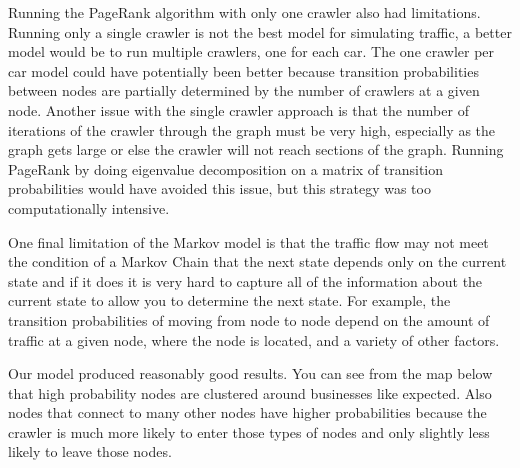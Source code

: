 \documentclass{article}
\begin{document}
Running the PageRank algorithm with only one crawler also had limitations. Running only a single crawler is not the best model for simulating traffic, a better model would be to run multiple crawlers, one for each car. The one crawler per car model could have potentially been better because transition probabilities between nodes are partially determined by the number of crawlers at a given node. Another issue with the single crawler approach is that the number of iterations of the crawler through the graph must be very high, especially as the graph gets large or else the crawler will not reach sections of the graph. Running PageRank by doing eigenvalue decomposition on a matrix of transition probabilities would have avoided this issue, but this strategy was too computationally intensive. 

One final limitation of the Markov model is that the traffic flow may not meet the condition of a Markov Chain that the next state depends only on the current state and if it does it is very hard to capture all of the information about the current state to allow you to determine the next state.  For example, the transition probabilities of moving from node to node depend on the amount of traffic at a given node, where the node is located, and a variety of other factors. 

Our model produced reasonably good results. You can see from the map below that high probability nodes are clustered around businesses like expected. Also nodes that connect to many other nodes have higher probabilities because the crawler is much more likely to enter those types of nodes and only slightly less likely to leave those nodes.
\end{document}
